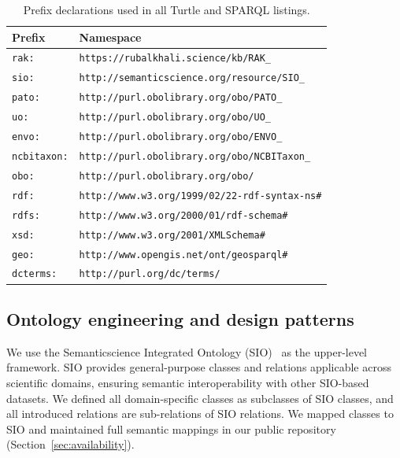 \documentclass[11pt,a4paper]{article}
\begin{document}
\begin{table}[h]
\centering
\caption{Prefix declarations used in all Turtle and SPARQL listings.}
\label{tab:prefixes}
\small
\begin{tabular}{ll}
\toprule
\textbf{Prefix} & \textbf{Namespace} \\
\midrule
\texttt{rak:}       & \texttt{https://rubalkhali.science/kb/RAK\_} \\
\texttt{sio:}       & \texttt{http://semanticscience.org/resource/SIO\_} \\
\texttt{pato:}      & \texttt{http://purl.obolibrary.org/obo/PATO\_} \\
\texttt{uo:}        & \texttt{http://purl.obolibrary.org/obo/UO\_} \\
\texttt{envo:}      & \texttt{http://purl.obolibrary.org/obo/ENVO\_} \\
\texttt{ncbitaxon:} & \texttt{http://purl.obolibrary.org/obo/NCBITaxon\_} \\
\texttt{obo:}       & \texttt{http://purl.obolibrary.org/obo/} \\
\texttt{rdf:}       & \texttt{http://www.w3.org/1999/02/22-rdf-syntax-ns\#} \\
\texttt{rdfs:}      & \texttt{http://www.w3.org/2000/01/rdf-schema\#} \\
\texttt{xsd:}       & \texttt{http://www.w3.org/2001/XMLSchema\#} \\
\texttt{geo:}       & \texttt{http://www.opengis.net/ont/geosparql\#} \\
\texttt{dcterms:}   & \texttt{http://purl.org/dc/terms/} \\
\bottomrule
\end{tabular}
\end{table}

\subsection{Ontology engineering and design patterns}\label{subsec:odps}

We use the Semanticscience Integrated Ontology (SIO)~\cite{sio} as
the upper-level framework. SIO provides general-purpose classes and
relations applicable across scientific domains, ensuring semantic
interoperability with other SIO-based datasets. We defined all
domain-specific classes as subclasses of SIO classes, and all
introduced relations are sub-relations of SIO relations. We mapped
classes to SIO and maintained full semantic mappings in our public
repository (Section~\ref{sec:availability}).
\end{document}
